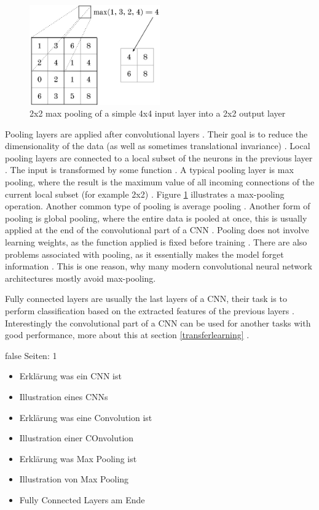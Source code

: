 \documentclass[draft,final,oneside]{vutinfth} %
\begin{document}
\begin{figure}[ht]
	\centering
  	\includegraphics[width=0.5\textwidth]{graphics/maxpooling.png}
	\caption{2x2 max pooling of a simple 4x4 input layer into a 2x2 output layer}
	\label{fig:maxpooling}
\end{figure}

Pooling layers are applied after convolutional layers \cite{alexnet}. Their goal is to reduce the dimensionality of the data (as well as sometimes translational invariance) \cite{dlvc}. Local pooling layers are connected to a local subset of the neurons in the previous layer \cite{Goodfellow-et-al-2016}. The input is transformed by some function \cite{dlvc}. A typical pooling layer is max pooling, where the result is the maximum value of all incoming connections of the current local subset (for example 2x2) \cite{Goodfellow-et-al-2016}. Figure \ref{fig:maxpooling} illustrates a max-pooling operation. Another common type of pooling is average pooling \cite{Goodfellow-et-al-2016}. Another form of pooling is global pooling, where the entire data is pooled at once, this is usually applied at the end of the convolutional part of a CNN \cite{Goodfellow-et-al-2016}. Pooling does not involve learning weights, as the function applied is fixed before training \cite{Goodfellow-et-al-2016}. There are also problems associated with pooling, as it essentially makes the model forget information \cite{resnet}. This is one reason, why many modern convolutional neural network architectures mostly avoid max-pooling. \cite{resnet}

Fully connected layers are usually the last layers of a CNN, their task is to perform classification based on the extracted features of the previous layers \cite{alexnet}. Interestingly the convolutional part of a CNN can be used for another tasks with good performance, more about this at section \ref{transferlearning} \cite{deeplearninginneuralnetworks}.

\if false
Seiten: 1
\begin{itemize}

\item Erklärung was ein CNN ist
\item Illustration eines CNNs
\item Erklärung was eine Convolution ist
\item Illustration einer COnvolution
\item Erklärung was Max Pooling ist
\item Illustration von Max Pooling
\item Fully Connected Layers am Ende


\end{itemize}
\fi
\end{document}
